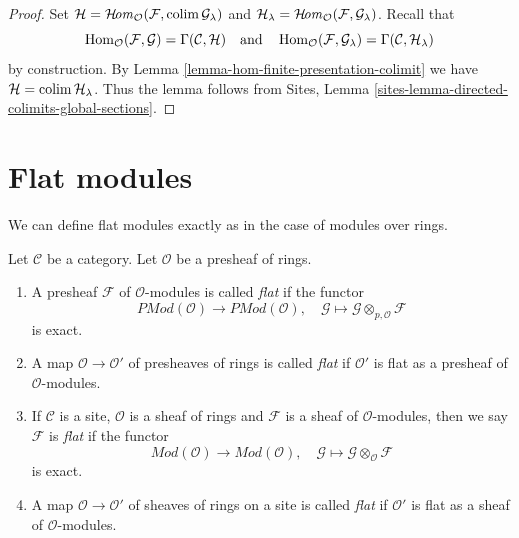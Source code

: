 \begin{proof}
Set $\mathcal{H} =
\mathop{\mathcal{H}\!\mathit{om}}\nolimits_\mathcal{O}(\mathcal{F}, \mathop{\mathrm{colim}}\nolimits \mathcal{G}_\lambda)$
and $\mathcal{H}_\lambda =
\mathop{\mathcal{H}\!\mathit{om}}\nolimits_\mathcal{O}(\mathcal{F}, \mathcal{G}_\lambda)$.
Recall that
$$
\mathop{\mathrm{Hom}}\nolimits_\mathcal{O}(\mathcal{F}, \mathcal{G}) = \Gamma(\mathcal{C}, \mathcal{H})
\quad\text{and}\quad
\mathop{\mathrm{Hom}}\nolimits_\mathcal{O}(\mathcal{F}, \mathcal{G}_\lambda) =
\Gamma(\mathcal{C}, \mathcal{H}_\lambda)
$$
by construction. By Lemma \ref{lemma-hom-finite-presentation-colimit} we have
$\mathcal{H} = \mathop{\mathrm{colim}}\nolimits \mathcal{H}_\lambda$. Thus the lemma follows from
Sites, Lemma \ref{sites-lemma-directed-colimits-global-sections}.
\end{proof}









\section{Flat modules}
\label{section-flat}

\noindent
We can define flat modules exactly as in the case of modules over rings.

\begin{definition}
\label{definition-flat}
Let $\mathcal{C}$ be a category.
Let $\mathcal{O}$ be a presheaf of rings.
\begin{enumerate}
\item A presheaf $\mathcal{F}$ of $\mathcal{O}$-modules is called
{\it flat} if the functor
$$
\textit{PMod}(\mathcal{O})
\longrightarrow
\textit{PMod}(\mathcal{O}), \quad
\mathcal{G} \mapsto \mathcal{G} \otimes_{p, \mathcal{O}} \mathcal{F}
$$
is exact.
\item A map $\mathcal{O} \to \mathcal{O}'$ of presheaves of rings
is called {\it flat} if $\mathcal{O}'$ is flat as a presheaf of
$\mathcal{O}$-modules.
\item If $\mathcal{C}$ is a site, $\mathcal{O}$ is a sheaf of rings
and $\mathcal{F}$ is a sheaf of $\mathcal{O}$-modules, then we
say $\mathcal{F}$ is {\it flat} if the functor
$$
\textit{Mod}(\mathcal{O})
\longrightarrow
\textit{Mod}(\mathcal{O}), \quad
\mathcal{G} \mapsto \mathcal{G} \otimes_\mathcal{O} \mathcal{F}
$$
is exact.
\item A map $\mathcal{O} \to \mathcal{O}'$ of sheaves of rings on a site
is called {\it flat} if $\mathcal{O}'$ is flat as a sheaf of
$\mathcal{O}$-modules.
\end{enumerate}
\end{definition}

